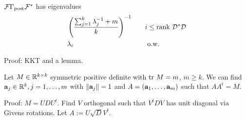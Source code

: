 \documentclass{beamer}
\begin{document}


\begin{frame}
  \begin{theorem}[D.]
    \( \mathcal{F} \Gamma_{\textup{post}} \mathcal{F}^*\)
    has eigenvalues 
    \begin{align*}
      &\left(\frac{\sum_{j=1}^k \lambda_j^{-1} + m}{k} \right )^{-1} &&\quad i \leq \textup{rank}\  \mathcal{D}^*\mathcal{D} \\
      &\lambda_i  &&\quad \text{ o.w.}
    \end{align*}
  \end{theorem}
  \pause Proof: KKT and a lemma.
\end{frame}

\begin{frame}
  \begin{lemma}[D.]
    Let $M \in \mathbb{R}^{k \times k}$ symmetric positive definite with $\textup{tr}\ M = m$, $m \geq k$. We can find $\mathbf{a}_j \in \mathbb{R}^k,j=1,\dots,m$
    with $\|\mathbf{a}_j\|=1$ and $A = (\mathbf{a}_1,\dots,\mathbf{a}_m)$ such that
    $AA^t = M$.
  \end{lemma}
  \pause Proof: $M = UDU^t$. Find $V$ orthogonal such that $V^tDV$ has
  unit diagonal via Givens rotations. Let $A := U\sqrt{D} V^t$.
\end{frame}
\end{document}
